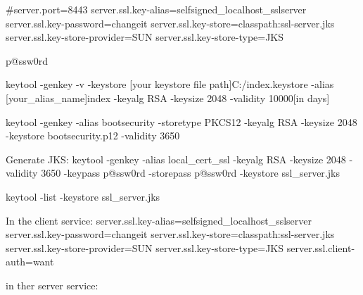 #server.port=8443
server.ssl.key-alias=selfsigned_localhost_sslserver
server.ssl.key-password=changeit
server.ssl.key-store=classpath:ssl-server.jks
server.ssl.key-store-provider=SUN
server.ssl.key-store-type=JKS



p@ssw0rd


keytool -genkey -v -keystore [your keystore file path]{C:/index.keystore} -alias [your_alias_name]{index} -keyalg RSA -keysize 2048 -validity 10000[in days]

keytool -genkey -alias bootsecurity -storetype PKCS12 -keyalg RSA -keysize 2048 -keystore bootsecurity.p12 -validity 3650

Generate JKS:
keytool -genkey -alias local_cert_ssl -keyalg RSA -keysize 2048 -validity 3650 -keypass p@ssw0rd -storepass p@ssw0rd -keystore ssl_server.jks


keytool -list -keystore ssl_server.jks


In the client service:
server.ssl.key-alias=selfsigned_localhost_sslserver
server.ssl.key-password=changeit
server.ssl.key-store=classpath:ssl-server.jks
server.ssl.key-store-provider=SUN
server.ssl.key-store-type=JKS
server.ssl.client-auth=want

in ther server service:
